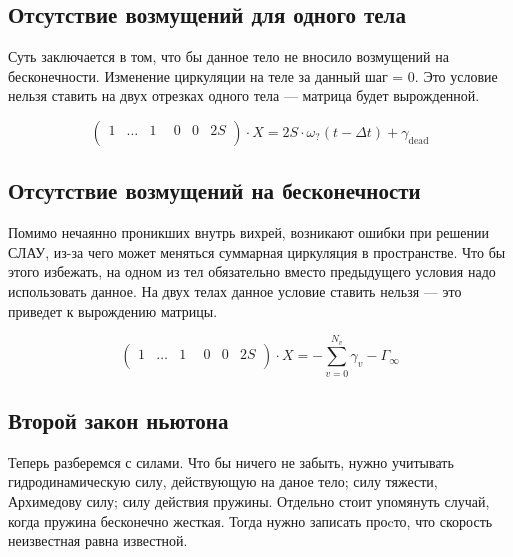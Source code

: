 \documentclass[14pt]{extreport}
\begin{document}
\subsection{Отсутствие возмущений для одного тела}

Суть заключается в том, что бы данное тело не вносило возмущений на бесконечности.
Изменение циркуляции на теле за данный шаг = 0. Это условие нельзя ставить на двух отрезках одного тела --- матрица будет вырожденной.

\begin{equation*}
\left(\begin{matrix}
1& \dotsc& 1& ~~0& 0& 2S\\
\end{matrix}\right)
\cdot X = 2S \cdot \omega_?(t-\Delta t) + \gamma_\text{dead}
\end{equation*}

\subsection{Отсутствие возмущений на бесконечности}

Помимо нечаянно проникших внутрь вихрей, возникают ошибки при решении СЛАУ, из-за чего может меняться суммарная циркуляция в пространстве.
Что бы этого избежать, на одном из тел обязательно вместо предыдущего условия надо использовать данное. На двух телах данное условие ставить нельзя --- это приведет к вырождению матрицы.

\begin{equation*}
\left(\begin{matrix}
1& \dotsc& 1& ~~0& 0& 2S\\
\end{matrix}\right)
\cdot X = -\sum\limits_{v=0}^{N_v} \gamma_v - \Gamma_\infty
\end{equation*}

\subsection{Второй закон ньютона}

Теперь разберемся с силами. Что бы ничего не забыть, нужно учитывать гидродинамическую силу, действующую на даное тело; силу тяжести, Архимедову силу; силу действия пружины. Отдельно стоит упомянуть случай, когда пружина бесконечно жесткая. Тогда нужно записать проcто, что скорость неизвестная равна известной.
\end{document}
